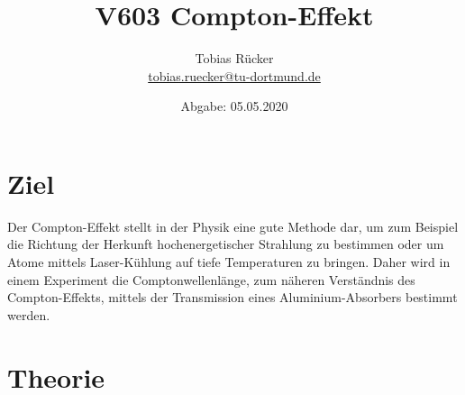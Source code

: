 


    \title{V603 Compton-Effekt}
    \author{  
    Tobias Rücker\\
    \texorpdfstring{\href{mailto:tobias.ruecker@tu-dortmund.de}{tobias.ruecker@tu-dortmund.de}}{}}
    
    \date{ Abgabe: 05.05.2020 \vspace{-4ex}}
\maketitle
\thispagestyle{empty}

\newpage
\tableofcontents
\thispagestyle{empty}
\newpage


\setcounter{page}{1}
\section{Ziel}\justifying

Der Compton-Effekt stellt in der Physik eine gute Methode dar, um zum Beispiel die Richtung der Herkunft hochenergetischer 
Strahlung zu bestimmen oder um Atome mittels Laser-Kühlung auf tiefe Temperaturen zu bringen. 
Daher wird in einem Experiment die Comptonwellenlänge, zum näheren Verständnis des Compton-Effekts,
mittels der Transmission eines Aluminium-Absorbers bestimmt werden.


\section{Theorie}\justifying

